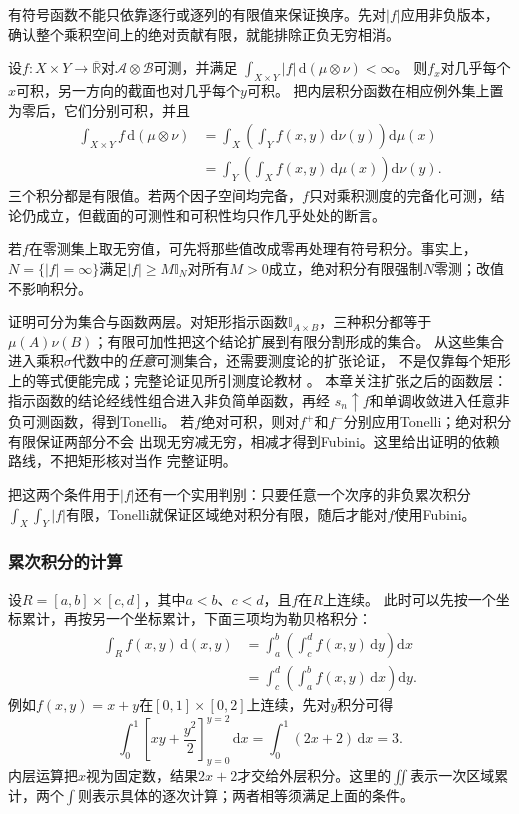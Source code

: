 有符号函数不能只依靠逐行或逐列的有限值来保证换序。先对$|f|$应用非负版本，确认整个乘积空间上的绝对贡献有限，就能排除正负无穷相消。
\begin{theorem}[Fubini定理]
\label{thm:analysis-fubini-integrable}
设$f:X\times Y\to\overline{\mathbb R}$对$\mathcal A\otimes\mathcal B$可测，并满足
$\int_{X\times Y}|f|\,\mathrm d(\mu\otimes\nu)<\infty$。
则$f_x$对几乎每个$x$可积，另一方向的截面也对几乎每个$y$可积。
把内层积分函数在相应例外集上置为零后，它们分别可积，并且
\[
 \begin{aligned}
 \int_{X\times Y}f\,\mathrm d(\mu\otimes\nu)
 &=\int_X\left(\int_Yf(x,y)\,\mathrm d\nu(y)\right)\mathrm d\mu(x)\\
 &=\int_Y\left(\int_Xf(x,y)\,\mathrm d\mu(x)\right)\mathrm d\nu(y).
 \end{aligned}
\]
三个积分都是有限值。若两个因子空间均完备，$f$只对乘积测度的完备化可测，结论仍成立，但截面的可测性和可积性均只作几乎处处的断言。
\end{theorem}

若$f$在零测集上取无穷值，可先将那些值改成零再处理有符号积分。事实上，$N=\{|f|=\infty\}$满足$|f|\geq M\mathbb I_N$对所有$M>0$成立，绝对积分有限强制$N$零测；改值不影响积分。

证明可分为集合与函数两层。对矩形指示函数$\mathbb I_{A\times B}$，三种积分都等于
$\mu(A)\nu(B)$；有限可加性把这个结论扩展到有限分割形成的集合。
从这些集合进入乘积$\sigma$代数中的\emph{任意}可测集合，还需要测度论的扩张论证，
不是仅靠每个矩形上的等式便能完成；完整论证见所引测度论教材
。
本章关注扩张之后的函数层：指示函数的结论经线性组合进入非负简单函数，再经
$s_n\uparrow f$和单调收敛进入任意非负可测函数，得到Tonelli。
若$f$绝对可积，则对$f^+$和$f^-$分别应用Tonelli；绝对积分有限保证两部分不会
出现无穷减无穷，相减才得到Fubini。这里给出证明的依赖路线，不把矩形核对当作
完整证明。


把这两个条件用于$|f|$还有一个实用判别：只要任意一个次序的非负累次积分$\int_X\int_Y|f|$有限，Tonelli就保证区域绝对积分有限，随后才能对$f$使用Fubini。

\subsubsection{累次积分的计算}

设$R=[a,b]\times[c,d]$，其中$a<b$、$c<d$，且$f$在$R$上连续。
此时可以先按一个坐标累计，再按另一个坐标累计，下面三项均为勒贝格积分：
\[
 \begin{aligned}
 \int_R f(x,y)\,\mathrm d(x,y)
 &=\int_a^b\left(\int_c^d f(x,y)\,\mathrm dy\right)\mathrm dx\\
 &=\int_c^d\left(\int_a^b f(x,y)\,\mathrm dx\right)\mathrm dy.
 \end{aligned}
\]
例如$f(x,y)=x+y$在$[0,1]\times[0,2]$上连续，先对$y$积分可得
\[
 \int_0^1\left[xy+\frac{y^2}{2}\right]_{y=0}^{y=2}\,\mathrm dx
 =\int_0^1(2x+2)\,\mathrm dx=3.
\]
内层运算把$x$视为固定数，结果$2x+2$才交给外层积分。这里的$\iint$表示一次区域累计，两个$\int$则表示具体的逐次计算；两者相等须满足上面的条件。

